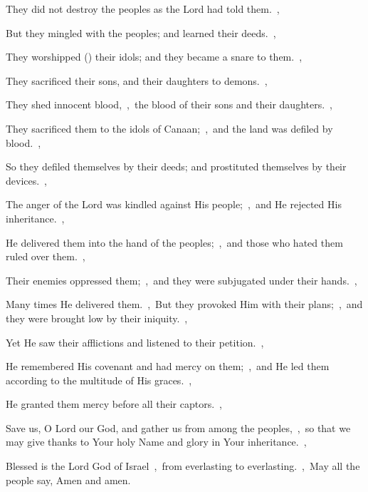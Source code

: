 \documentclass[12pt,twoside,a5paper]{article}
\begin{document}
\begin{normalparskip}
  They did not destroy the peoples as the Lord had told them.~\sep

  But they mingled with the peoples; and learned their deeds.~\sep

  They worshipped () their idols; and they became a snare to them.~\sep

  They sacrificed their sons, and their daughters to demons.~\sep

  They shed innocent blood,~\sep\ the blood of their sons and their daughters.~\sep

  They sacrificed them to the idols of Canaan;~\sep\ and the land was defiled by blood.~\sep

  So they defiled themselves by their deeds; and prostituted themselves by their devices.~\sep

  The anger of the Lord was kindled against His people;~\sep\ and He rejected His inheritance.~\sep

  He delivered them into the hand of the peoples;~\sep\ and those who hated them ruled over them.~\sep

  Their enemies oppressed them;~\sep\ and they were subjugated under their hands.~\sep

  Many times He delivered them.~\sep\ But they provoked Him with their plans;~\sep\ and they were brought low by their iniquity.~\sep

  Yet He saw their afflictions and listened to their petition.~\sep

  He remembered His covenant and had mercy on them;~\sep\ and He led them according to the multitude of His graces.~\sep

  He granted them mercy before all their captors.~\sep

  Save us, O Lord our God, and gather us from among the peoples,~\sep\ so that we may give thanks to Your holy Name and glory in Your inheritance.~\sep

  Blessed is the Lord God of Israel~\sep\ from everlasting to everlasting.~\sep\ May all the people say, Amen and amen.
\end{normalparskip}



\end{document}
